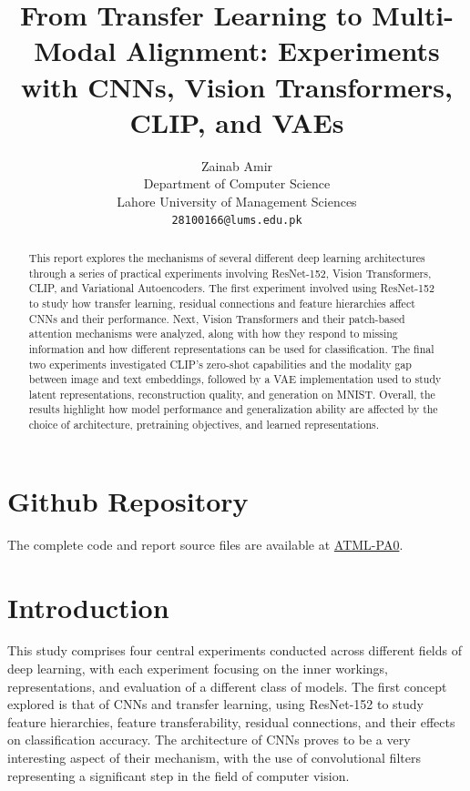 \documentclass{article}
\title{From Transfer Learning to Multi-Modal Alignment: Experiments with CNNs, Vision Transformers, CLIP, and VAEs}
\author{%
  Zainab Amir\\
  Department of Computer Science\\
  Lahore University of Management Sciences\\
  \texttt{28100166@lums.edu.pk} \\
}
\begin{document}
\maketitle


\begin{abstract}
  This report explores the mechanisms of several different deep learning architectures through a series of practical experiments involving ResNet-152, Vision Transformers, CLIP, and Variational Autoencoders. The first experiment involved using ResNet-152 to study how transfer learning, residual connections and feature hierarchies affect CNNs and their performance. Next, Vision Transformers and their patch-based attention mechanisms were analyzed, along with how they respond to missing information and how different representations can be used for classification. The final two experiments investigated CLIP's zero-shot capabilities and the modality gap between image and text embeddings, followed by a VAE implementation used to study latent representations, reconstruction quality, and generation on MNIST. Overall, the results highlight how model performance and generalization ability are affected by the choice of architecture, pretraining objectives, and learned representations.
\end{abstract}

\section*{Github Repository}

The complete code and report source files are available at
\href{https://github.com/Zeeba1705/atml_PA0}{ATML-PA0}.

\section{Introduction}

This study comprises four central experiments conducted across different fields of deep learning, with each experiment focusing on the inner workings, representations, and evaluation of a different class of models. The first concept explored is that of CNNs and transfer learning, using ResNet-152 to study feature hierarchies, feature transferability, residual connections, and their effects on classification accuracy. The architecture of CNNs proves to be a very interesting aspect of their mechanism, with the use of convolutional filters representing a significant step in the field of computer vision.
\end{document}
